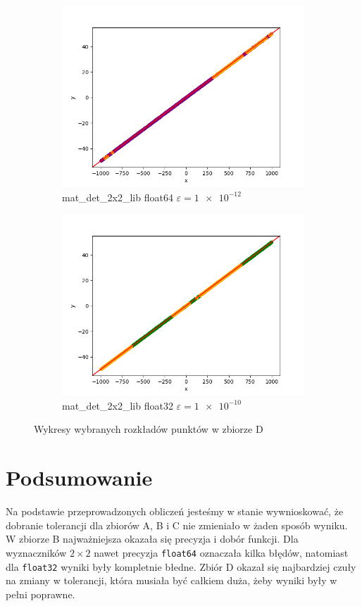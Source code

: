 \documentclass[11pt,a4paper]{article}
\begin{document}
\begin{figure}[H]
\begin{subfigure}[b]{0.46\textwidth}
        \includegraphics[scale=0.4]{res/lin_mat_det_2x2_lib_float64_1e-12.png}
        \caption{\ttfamily\arraybackslash mat\_det\_2x2\_lib float64 $\varepsilon=\num{1e-12}$}
    \end{subfigure}
    \begin{subfigure}[b]{0.46\textwidth}
        \centering
        \includegraphics[scale=0.4]{res/lin_mat_det_2x2_lib_float32_1e-10}
        \caption{\ttfamily\arraybackslash mat\_det\_2x2\_lib float32 $\varepsilon=\num{1e-10}$}
    \end{subfigure}
    \caption{Wykresy wybranych rozkładów punktów w zbiorze D}
\end{figure}

\section{Podsumowanie}
Na podstawie przeprowadzonych obliczeń jesteśmy w stanie wywnioskować,
że dobranie tolerancji dla zbiorów A, B i C nie zmieniało w żaden sposób wyniku. 
W zbiorze B najważniejsza okazała się precyzja i dobór funkcji. Dla wyznaczników 
$2\times2$ nawet precyzja \verb|float64| oznaczała kilka błędów, natomiast 
dla \verb|float32| wyniki były kompletnie błedne.
Zbiór D okazał się najbardziej czuły na zmiany w tolerancji, 
która musiała być całkiem duża, żeby wyniki były w pełni poprawne.
\end{document}
